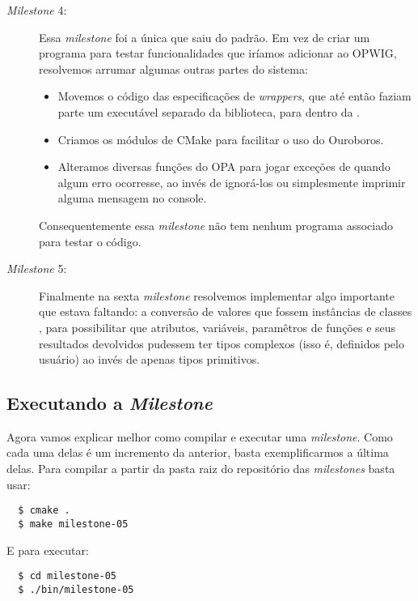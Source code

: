 \begin{description}
  \item[\textit{Milestone} 4:] Essa \textit{milestone} foi a única que saiu do padrão.
    Em vez de criar um programa para testar funcionalidades que iríamos adicionar
    ao OPWIG, resolvemos arrumar algumas outras partes do sistema:
    \begin{itemize}
      \item Movemos o código das especificações de \textit{wrappers}, que até então
        faziam parte um executável separado da biblioteca, para dentro da
        .
      \item Criamos os módulos de CMake para facilitar o uso do Ouroboros.
      \item Alteramos diversas funções do OPA para jogar exceções de \CXX{} quando algum erro
        ocorresse, ao invés de ignorá-los ou simplesmente imprimir alguma mensagem no console.
    \end{itemize}
    Consequentemente essa \textit{milestone} não tem nenhum programa associado para testar o
    código.
    
  \item[\textit{Milestone} 5:] Finalmente na sexta \textit{milestone} resolvemos implementar algo
    importante que estava faltando: a conversão de valores que fossem instâncias de classes
    \CXX{}, para possibilitar que atributos, variáveis, paramêtros de funções e seus resultados
    devolvidos pudessem ter tipos complexos (isso é, definidos pelo usuário) ao invés
    de apenas tipos primitivos.
    
\end{description}

\subsection{Executando a \textit{Milestone}}
Agora vamos explicar melhor como compilar e executar uma \textit{milestone}. Como cada 
uma delas é um incremento da anterior, basta exemplificarmos a última delas. Para compilar
a partir da pasta raiz do repositório das \textit{milestones} basta usar:

\begin{verbatim}
  $ cmake .
  $ make milestone-05
\end{verbatim}

E para executar:

\begin{verbatim}
  $ cd milestone-05
  $ ./bin/milestone-05
\end{verbatim}


